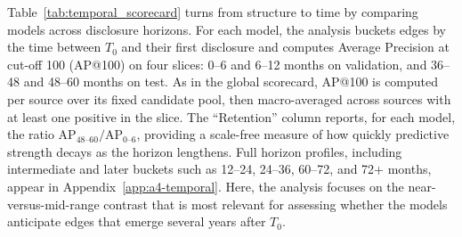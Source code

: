 Table~\ref{tab:temporal_scorecard} turns from structure to time by comparing models across disclosure horizons. For each model, the analysis buckets edges by the time between \(T_0\) and their first disclosure and computes Average Precision at cut-off 100 (AP@100) on four slices: 0--6 and 6--12 months on validation, and 36--48 and 48--60 months on test. As in the global scorecard, AP@100 is computed per source over its fixed candidate pool, then macro-averaged across sources with at least one positive in the slice. The ``Retention'' column reports, for each model, the ratio \(\text{AP}_{48\text{--}60} / \text{AP}_{0\text{--}6}\), providing a scale-free measure of how quickly predictive strength decays as the horizon lengthens. Full horizon profiles, including intermediate and later buckets such as 12--24, 24--36, 60--72, and 72+ months, appear in Appendix~\ref{app:a4-temporal}. Here, the analysis focuses on the near-versus-mid-range contrast that is most relevant for assessing whether the models anticipate edges that emerge several years after \(T_0\).

